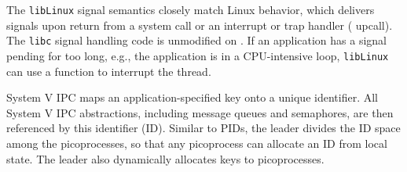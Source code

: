 The \sysname{} {\tt libLinux} signal semantics closely match Linux behavior, which
delivers signals upon return from a system call or an interrupt or trap handler (\pal{} upcall).
The {\tt libc} signal handling code is unmodified on \sysname{}.
If an application has a signal pending for too long,
e.g., the application is in a CPU-intensive loop, {\tt libLinux} can use a \pal{} function to interrupt 
the thread. 




\begin{comment}
\sysname{} internally indexes point-to-point handles using PIDs.
In order to facilitate reallocation of PIDs without global coordination, 
\sysname{}-internal PIDs also include a {\em generation number},
allowing picoprocesses to lazily detect reuse similar to generation numbers 
for inodes in NFS~\citep{sandberg85nfs}.
\end{comment}

\vspace{5pt}
 System V IPC
maps an application-specified key onto a unique identifier.
All System V IPC abstractions, including message queues and semaphores,
are then referenced by this identifier (ID).
Similar to PIDs, 
the leader divides the ID space among the picoprocesses, so that any picoprocess
can allocate an ID from local state. %
The leader also dynamically allocates keys to picoprocesses.

